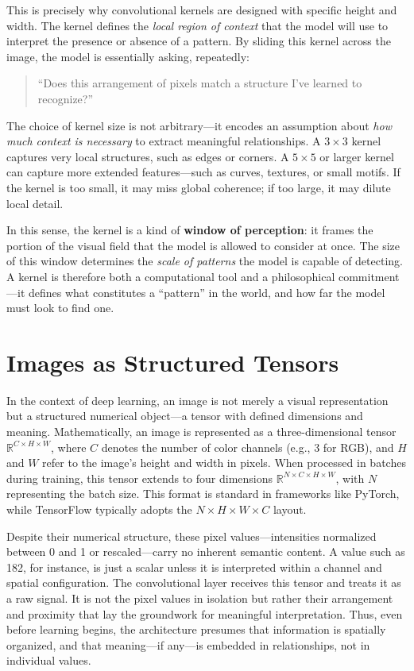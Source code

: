 This is precisely why convolutional kernels are designed with specific height and width.  
The kernel defines the \textit{local region of context} that the model will use to interpret the presence or absence of a pattern. By sliding this kernel across the image, the model is essentially asking, repeatedly:
\begin{quote}
	“Does this arrangement of pixels match a structure I’ve learned to recognize?”
\end{quote}

The choice of kernel size is not arbitrary—it encodes an assumption about \textit{how much context is necessary} to extract meaningful relationships. A $3 \times 3$ kernel captures very local structures, such as edges or corners. A $5 \times 5$ or larger kernel can capture more extended features—such as curves, textures, or small motifs. If the kernel is too small, it may miss global coherence; if too large, it may dilute local detail.

In this sense, the kernel is a kind of \textbf{window of perception}: it frames the portion of the visual field that the model is allowed to consider at once. The size of this window determines the \textit{scale of patterns} the model is capable of detecting. A kernel is therefore both a computational tool and a philosophical commitment—it defines what constitutes a “pattern” in the world, and how far the model must look to find one.


\section{Images as Structured Tensors}

In the context of deep learning, an image is not merely a visual representation but a structured numerical object—a tensor with defined dimensions and meaning. Mathematically, an image is represented as a three-dimensional tensor \( \mathbb{R}^{C \times H \times W} \), where \( C \) denotes the number of color channels (e.g., 3 for RGB), and \( H \) and \( W \) refer to the image’s height and width in pixels. When processed in batches during training, this tensor extends to four dimensions \( \mathbb{R}^{N \times C \times H \times W} \), with \( N \) representing the batch size. This format is standard in frameworks like PyTorch, while TensorFlow typically adopts the \( N \times H \times W \times C \) layout. 

Despite their numerical structure, these pixel values—intensities normalized between 0 and 1 or rescaled—carry no inherent semantic content. A value such as 182, for instance, is just a scalar unless it is interpreted within a channel and spatial configuration. The convolutional layer receives this tensor and treats it as a raw signal. It is not the pixel values in isolation but rather their arrangement and proximity that lay the groundwork for meaningful interpretation. Thus, even before learning begins, the architecture presumes that information is spatially organized, and that meaning—if any—is embedded in relationships, not in individual values.

